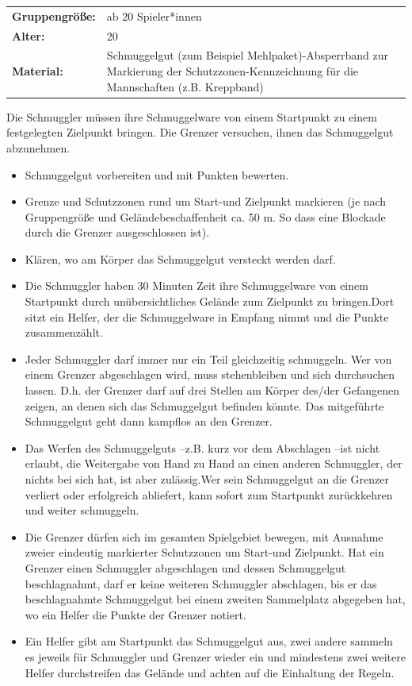 \begin{table}[H]
\begin{tabular}{>{\bfseries}lp{8cm}}
   Gruppengröße:   & ab 20 Spieler*innen\\
    Alter: & 20 \\
    Material: & Schmuggelgut (zum Beispiel Mehlpaket)-Absperrband zur Markierung der Schutzzonen-Kennzeichnung für die Mannschaften (z.B. Kreppband) \\ 
\end{tabular}
\end{table} 
Die Schmuggler müssen ihre Schmuggelware von einem Startpunkt zu einem festgelegten Zielpunkt bringen. Die Grenzer versuchen, ihnen das Schmuggelgut abzunehmen.
\begin{itemize}
    \item Schmuggelgut vorbereiten und mit Punkten bewerten.
    \item Grenze und Schutzzonen rund um Start-und Zielpunkt markieren (je nach Gruppengröße und Geländebeschaffenheit ca. 50 m. So dass eine Blockade durch die Grenzer ausgeschlossen ist).
    \item Klären, wo am Körper das Schmuggelgut versteckt werden darf.
    \item Die Schmuggler haben 30 Minuten Zeit ihre Schmuggelware von einem Startpunkt durch unübersichtliches Gelände zum Zielpunkt zu bringen.Dort sitzt ein Helfer, der die Schmuggelware in Empfang nimmt und die Punkte zusammenzählt.
    \item Jeder Schmuggler darf immer nur ein Teil gleichzeitig schmuggeln. Wer von einem Grenzer abgeschlagen wird, muss stehenbleiben und sich durchsuchen lassen. D.h. der Grenzer darf auf drei Stellen am Körper des/der Gefangenen zeigen, an denen sich das Schmuggelgut befinden könnte. Das mitgeführte Schmuggelgut geht dann kampflos an den Grenzer. 
    \item Das Werfen des Schmuggelguts –z.B. kurz vor dem Abschlagen –ist nicht erlaubt, die Weitergabe von Hand zu Hand an einen anderen Schmuggler, der nichts bei sich hat, ist aber zulässig.Wer sein Schmuggelgut an die Grenzer verliert oder erfolgreich abliefert, kann sofort zum Startpunkt zurückkehren und weiter schmuggeln. 
    \item Die Grenzer dürfen sich im gesamten Spielgebiet bewegen, mit Ausnahme zweier eindeutig markierter Schutzzonen um Start-und Zielpunkt. Hat ein Grenzer einen Schmuggler abgeschlagen und dessen Schmuggelgut beschlagnahmt, darf er keine weiteren Schmuggler abschlagen, bis er das beschlagnahmte Schmuggelgut bei einem zweiten Sammelplatz abgegeben hat, wo ein Helfer die Punkte der Grenzer notiert. 
    \item Ein Helfer gibt am Startpunkt das Schmuggelgut aus, zwei andere sammeln es jeweils für Schmuggler und Grenzer wieder ein und mindestens zwei weitere Helfer 
durchstreifen das Gelände und achten auf die Einhaltung der Regeln.
\end{itemize}
